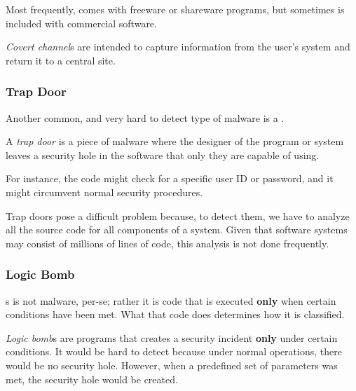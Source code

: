 Most frequently,  comes with freeware or shareware programs, but sometimes is included with commercial software.

\begin{definition}\label{def:Covert_Channel}
  \emph{Covert channel}s are intended to capture information from the user’s system and return it to a central site.
\end{definition}

\subsubsection{Trap Door}\label{subsubsec:Trap_Door}
Another common, and very hard to detect type of malware is a .
\begin{definition}\label{def:Trap_Door}
  A \emph{trap door} is a piece of malware where the designer of the program or system leaves a security hole in the software that only they are capable of using.
\end{definition}

For instance, the code might check for a specific user ID or password, and it might circumvent normal security procedures.

Trap doors pose a difficult problem because, to detect them, we have to analyze all the source code for all components of a system.
Given that software systems may consist of millions of lines of code, this analysis is not done frequently.

\subsubsection{Logic Bomb}\label{subsubsec:Logic_Bomb}
s is not malware, per-se; rather it is code that is executed \textbf{only} when certain conditions have been met.
What that code does determines how it is classified.

\begin{definition}\label{def:Logic_Bomb}
  \emph{Logic bomb}s are programs that creates a security incident \textbf{only} under certain conditions.
  It would be hard to detect because under normal operations, there would be no security hole.
  However, when a predefined set of parameters was met, the security hole would be created.
\end{definition}


